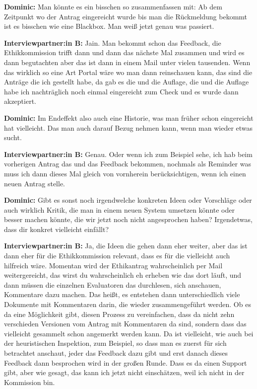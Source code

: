 \documentclass[a4paper,12pt,twoside]{scrreprt}
\begin{document}
\textbf{Dominic:} Man könnte es ein bisschen so zusammenfassen mit: Ab dem Zeitpunkt wo der Antrag eingereicht wurde bis man die Rückmeldung bekommt ist es bisschen wie eine Blackbox. Man weiß jetzt genau was passiert.

\textbf{Interviewpartner:in B:} Jain. Man bekommt schon das Feedback, die Ethikkommission trifft dann und dann das nächste Mal zusammen und wird es dann begutachten aber das ist dann in einem Mail unter vielen tausenden. Wenn das wirklich so eine Art Portal wäre wo man dann reinschauen kann, das sind die Anträge die ich gestellt habe, da gab es die und die Auflage, die und die Auflage habe ich nachträglich noch einmal eingereicht zum Check und es wurde dann akzeptiert.

\textbf{Dominic:} Im Endeffekt also auch eine Historie, was man früher schon eingereicht hat vielleicht. Das man auch darauf Bezug nehmen kann, wenn man wieder etwas sucht.

\textbf{Interviewpartner:in B:} Genau. Oder wenn ich zum Beispiel sehe, ich hab beim vorherigen Antrag das und das Feedback bekommen, nochmals als Reminder was muss ich dann dieses Mal gleich von vornherein berücksichtigen, wenn ich einen neuen Antrag stelle.

\textbf{Dominic:} Gibt es sonst noch irgendwelche konkreten Ideen oder Vorschläge oder auch wirklich Kritik, die man in einem neuen System umsetzen könnte oder besser machen könnte, die wir jetzt noch nicht angesprochen haben? Irgendetwas, dass dir konkret vielleicht einfällt?

\textbf{Interviewpartner:in B:} Ja, die Ideen die gehen dann eher weiter, aber das ist dann eher für die Ethikkommission relevant, dass es für die vielleicht auch hilfreich wäre. Momentan wird der Ethikantrag wahrscheinlich per Mail weitergereicht, das wirst du wahrscheinlich eh erheben wie das dort läuft, und dann müssen die einzelnen Evaluatoren das durchlesen, sich anschauen, Kommentare dazu machen. Das heißt, es entstehen dann unterschiedlich viele Dokumente mit Kommentaren darin, die wieder zusammengeführt werden. Ob es da eine Möglichkeit gibt, diesen Prozess zu vereinfachen, dass da nicht zehn verschieden Versionen vom Antrag mit Kommentaren da sind, sondern dass das vielleicht gesammelt schon angemerkt werden kann. Da ist vielleicht, wie auch bei der heuristischen Inspektion, zum Beispiel, so dass man es zuerst für sich betrachtet anschaut, jeder das Feedback dazu gibt und erst danach dieses Feedback dann besprochen wird in der großen Runde. Dass es da einen Support gibt, aber wie gesagt, das kann ich jetzt nicht einschätzen, weil ich nicht in der Kommission bin.
\end{document}
